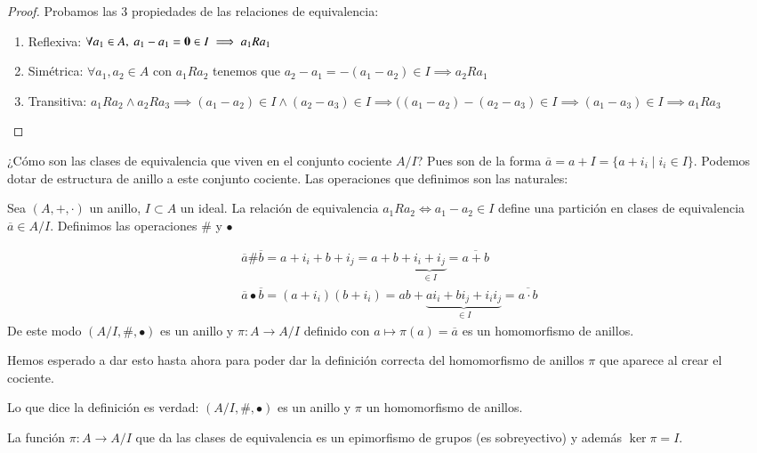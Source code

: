 \begin{proof}Probamos las 3 propiedades de las relaciones de equivalencia:
	\begin{enumerate}
		\item Reflexiva: $\forall a_1 \in A,\ a_1 - a_1 = \mathbf{0} \in I \implies a_1Ra_1$
		\item Simétrica: $\forall a_1, a_2 \in A$ con $a_1 R a_2$ tenemos que $a_2 - a_1 = -(a_1 - a_2) \in I \implies a_2 R a_1$
		\item Transitiva: $a_1Ra_2 \land a_2Ra_3 \implies (a_1 - a_2) \in I \land (a_2 - a_3) \in I \implies ((a_1 - a_2) - (a_2 - a_3) \in I \implies (a_1 - a_3) \in I \implies a_1 R a_3$
	\end{enumerate}
\end{proof}

¿Cómo son las clases de equivalencia que viven en el conjunto cociente $A/I$? Pues son de la forma $\overline{a} = a + I = \{a + i_i \mid i_i \in I\}$. Podemos dotar de estructura de anillo a este conjunto cociente. Las operaciones que definimos son las naturales:

\begin{dfn}
	Sea $(A, +, \cdot)$ un anillo, $I \subset A$ un ideal. La relación de equivalencia $a_1 R a_2 \iff a_1 - a_2 \in I$ define una partición en clases de equivalencia $\overline{a} \in A/I$. Definimos las operaciones $\#$ y $\bullet$
	
	\begin{align}
	\overline{a} \# \overline{b} = a + i_i + b + i_j = a+b + \underbrace{i_i + i_j}_{\in I} = \overline{a+b} \\
	\overline{a}\bullet\overline{b} = (a+i_i)(b+i_i) = ab + \underbrace{a i_i + b i_j + i_i i_j}_{\in I} = \overline{a \cdot b}
	\end{align}
	De este modo $(A/I, \#, \bullet)$ es un anillo y $\pi: A \to A/I$ definido con $a \mapsto \pi(a) = \overline{a}$ es un homomorfismo de anillos.
\end{dfn}

Hemos esperado a dar esto hasta ahora para poder dar la definición correcta del homomorfismo de anillos $\pi$ que aparece al crear el cociente.

\begin{pro}
	Lo que dice la definición es verdad: $(A/I, \#, \bullet)$ es un anillo y $\pi$ un homomorfismo de anillos.
\end{pro}

\begin{pro}
	La función $\pi: A \to A/I$ que da las clases de equivalencia es un epimorfismo de grupos (es sobreyectivo) y además $\ker \pi = I$.
\end{pro}

